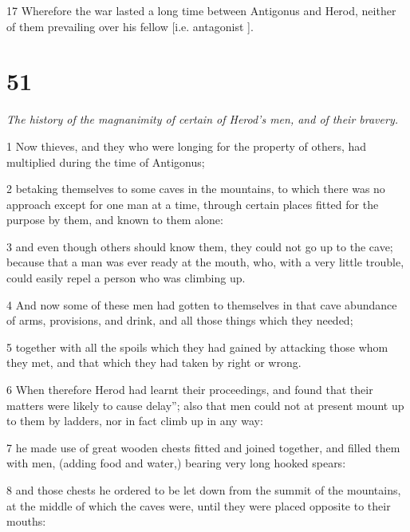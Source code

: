 \par 17 Wherefore the war lasted a long time between Antigonus and Herod, neither of them prevailing over his fellow [i.e. antagonist ]. 

\chapter{51}

\par \textit{The history of the magnanimity of certain of Herod's men, and of their bravery.}

\par 1 Now thieves, and they who were longing for the property of others, had multiplied during the time of Antigonus; 

\par 2 betaking themselves to some caves in the mountains, to which there was no approach except for one man at a time, through certain places fitted for the purpose by them, and known to them alone: 

\par 3 and even though others should know them, they could not go up to the cave; because that a man was ever ready at the mouth, who, with a very little trouble, could easily repel a person who was climbing up. 

\par 4 And now some of these men had gotten to themselves in that cave abundance of arms, provisions, and drink, and all those things which they needed; 

\par 5 together with all the spoils which they had gained by attacking those whom they met, and that which they had taken by right or wrong. 

\par 6 When therefore Herod had learnt their proceedings, and found that their matters were likely to cause delay”; also that men could not at present mount up to them by ladders, nor in fact climb up in any way: 

\par 7 he made use of great wooden chests fitted and joined together, and filled them with men, (adding food and water,) bearing very long hooked spears: 

\par 8 and those chests he ordered to be let down from the summit of the mountains, at the middle of which the caves were, until they were placed opposite to their mouths: 

